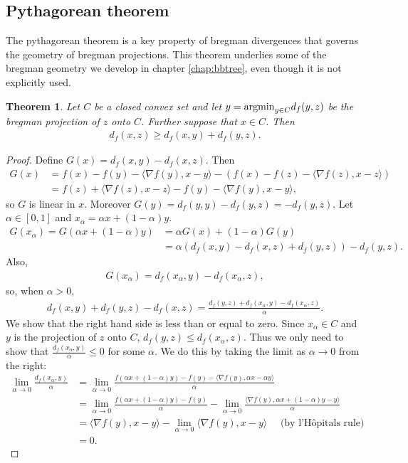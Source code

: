 \documentclass{article}
\newtheorem{theorem}{Theorem}
\newcommand{\argmin}{\mbox{\textup{argmin}}}
\begin{document}
\subsection{Pythagorean theorem}
The pythagorean theorem is a key property of bregman divergences that
governs the geometry of bregman projections.  This theorem 
underlies some of the bregman geometry we develop in chapter
\ref{chap:bbtree}, even though it is not explicitly used.  
\begin{theorem} Let $C$ be a closed convex set and let $y = \argmin_{y \in C}
  d_f(y,z)$ be the bregman projection of $z$ onto $C$.  Further suppose
  that $x\in C$.  Then 
\begin{align*}
d_f(x,z) \geq d_f(x,y) + d_f(y,z).
\end{align*} \label{thm:pythagineq}
\end{theorem} 
\begin{proof}
Define $G(x) = d_f(x,y)-d_f(x,z)$.  Then
\begin{align*}
G(x) &= f(x)-f(y) - \langle \nabla f(y),x-y\rangle - \left(
  f(x)-f(z)-\langle \nabla f(z),x-z \rangle \right)\\
&= f(z) + \langle \nabla f(z),x-z \rangle - f(y) - \langle \nabla
f(y), x-y \rangle,
\end{align*}
so $G$ is linear in $x$.  Moreover $G(y)= d_f(y,y) - d_f(y,z) =
-d_f(y,z)$. Let $\alpha \in [0,1]$ and $x_\alpha = \alpha x + (1-\alpha)y$.   
\begin{align*}
G(x_\alpha) = G(\alpha x + (1-\alpha) y) &= \alpha G(x) +
(1-\alpha)G(y) \\
&= \alpha (d_f(x,y)-d_f(x,z) +d_f(y,z)) -d_f(y,z).
\end{align*}
Also,
\begin{align*}
G(x_\alpha) =d_f(x_\alpha,y) - d_f(x_\alpha,z),
\end{align*}
so, when $\alpha>0$,
\begin{align*}
d_f(x,y) +d_f(y,z) - d_f(x,z) = \frac{d_f(y,z)+ d_f(x_\alpha,y) -
  d_f(x_\alpha,z)}{\alpha}.
\end{align*}
We show that the right hand side is less than or equal to zero.  Since
$x_\alpha \in C$ and $y$ is the projection of $z$ onto $C$, $d_f(y,z)
\leq d_f(x_\alpha,z)$. Thus we only need to show that
$\frac{d_f(x_\alpha,y)}{\alpha} \leq 0$ for some $\alpha$.  We do this
by taking the limit as $\alpha\rightarrow 0$ from the right:  
\begin{align*}
\lim_{\alpha\rightarrow 0} \frac{d_f(x_\alpha,y)}{\alpha} &=
\lim_{\alpha\rightarrow 0} \frac{f(\alpha x+ (1-\alpha)y) - f(y)
  -\langle \nabla f(y),\alpha x-\alpha y\rangle}{\alpha} \\
&= \lim_{\alpha\rightarrow 0} \frac{f(\alpha x + (1-\alpha)y) -
  f(y)}{\alpha} - \lim_{\alpha\rightarrow 0} \frac{\langle \nabla
  f(y),\alpha x + (1-\alpha)y -y \rangle}{\alpha}\\
&= \langle \nabla f(y),x-y \rangle - \lim_{\alpha\rightarrow 0}
\langle \nabla f(y),x-y \rangle \quad \mbox{ (by
  l'H\^{o}pitals rule) } \\
&= 0. 
\end{align*}
\end{proof}
\end{document}
